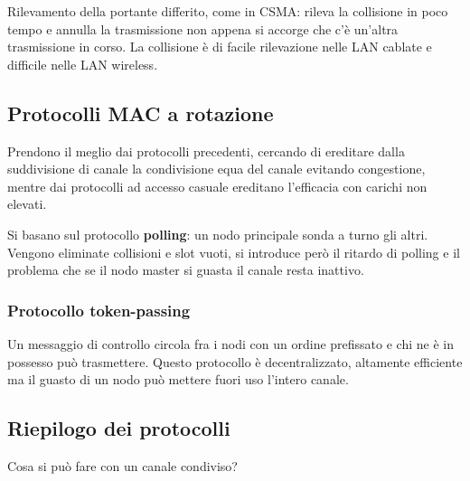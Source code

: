 \documentclass{report}
\begin{document}
Rilevamento della portante differito, come in CSMA: rileva la collisione
in poco tempo e annulla la trasmissione non appena si accorge che c'è
un'altra trasmissione in corso. La collisione è di facile rilevazione
nelle LAN cablate e difficile nelle LAN wireless.

\hypertarget{header-n81}{%
\subsection{Protocolli MAC a rotazione}\label{header-n81}}

Prendono il meglio dai protocolli precedenti, cercando di ereditare
dalla suddivisione di canale la condivisione equa del canale evitando
congestione, mentre dai protocolli ad accesso casuale ereditano
l'efficacia con carichi non elevati.

Si basano sul protocollo \textbf{polling}: un nodo principale sonda a
turno gli altri. Vengono eliminate collisioni e slot vuoti, si introduce
però il ritardo di polling e il problema che se il nodo master si guasta
il canale resta inattivo.

\hypertarget{header-n84}{%
\subsubsection{Protocollo token-passing}\label{header-n84}}

Un messaggio di controllo circola fra i nodi con un ordine prefissato e
chi ne è in possesso può trasmettere. Questo protocollo è
decentralizzato, altamente efficiente ma il guasto di un nodo può
mettere fuori uso l'intero canale.

\hypertarget{header-n86}{%
\subsection{Riepilogo dei protocolli}\label{header-n86}}

Cosa si può fare con un canale condiviso?
\end{document}
